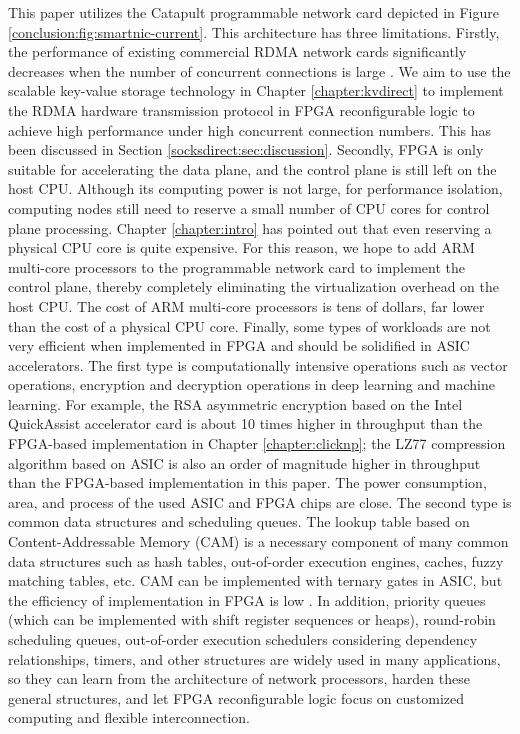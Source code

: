 This paper utilizes the Catapult programmable network card depicted in Figure \ref{conclusion:fig:smartnic-current}. This architecture has three limitations. Firstly, the performance of existing commercial RDMA network cards significantly decreases when the number of concurrent connections is large \cite{mprdma}. We aim to use the scalable key-value storage technology in Chapter \ref{chapter:kvdirect} to implement the RDMA hardware transmission protocol in FPGA reconfigurable logic to achieve high performance under high concurrent connection numbers. This has been discussed in Section \ref{socksdirect:sec:discussion}. Secondly, FPGA is only suitable for accelerating the data plane, and the control plane is still left on the host CPU. Although its computing power is not large, for performance isolation, computing nodes still need to reserve a small number of CPU cores for control plane processing. Chapter \ref{chapter:intro} has pointed out that even reserving a physical CPU core is quite expensive. For this reason, we hope to add ARM multi-core processors to the programmable network card to implement the control plane, thereby completely eliminating the virtualization overhead on the host CPU. The cost of ARM multi-core processors is tens of dollars, far lower than the cost of a physical CPU core. Finally, some types of workloads are not very efficient when implemented in FPGA and should be solidified in ASIC accelerators. The first type is computationally intensive operations such as vector operations, encryption and decryption operations in deep learning and machine learning. For example, the RSA asymmetric encryption based on the Intel QuickAssist accelerator card \cite{intel-qat} is about 10 times higher in throughput than the FPGA-based implementation in Chapter \ref{chapter:clicknp}; the LZ77 compression algorithm based on ASIC is also an order of magnitude higher in throughput than the FPGA-based implementation in this paper. The power consumption, area, and process of the used ASIC and FPGA chips are close. The second type is common data structures and scheduling queues. The lookup table based on Content-Addressable Memory (CAM) is a necessary component of many common data structures such as hash tables, out-of-order execution engines, caches, fuzzy matching tables, etc. CAM can be implemented with ternary gates in ASIC, but the efficiency of implementation in FPGA is low \cite{wong2011comparing}. In addition, priority queues (which can be implemented with shift register sequences or heaps), round-robin scheduling queues, out-of-order execution schedulers considering dependency relationships, timers, and other structures are widely used in many applications, so they can learn from the architecture of network processors, harden these general structures, and let FPGA reconfigurable logic focus on customized computing and flexible interconnection.

